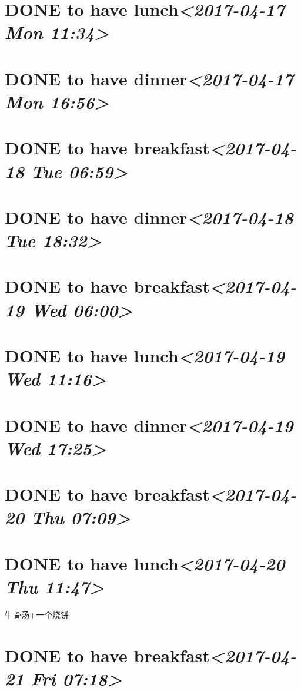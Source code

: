 \documentclass[cyan]{elegantnote}
\begin{document}
\section{{\bfseries\sffamily DONE} to have lunch\textit{<2017-04-17 Mon 11:34>}}
\label{sec:orgaa04249}
\section{{\bfseries\sffamily DONE} to have dinner\textit{<2017-04-17 Mon 16:56>}}
\label{sec:org9fb14c2}
\section{{\bfseries\sffamily DONE} to have breakfast\textit{<2017-04-18 Tue 06:59>}}
\label{sec:orge3dee3d}
\section{{\bfseries\sffamily DONE} to have dinner\textit{<2017-04-18 Tue 18:32>}}
\label{sec:orga96fb44}
\section{{\bfseries\sffamily DONE} to have breakfast\textit{<2017-04-19 Wed 06:00>}}
\label{sec:org2a4e7bb}
\section{{\bfseries\sffamily DONE} to have lunch\textit{<2017-04-19 Wed 11:16>}}
\label{sec:org56d9ffc}
\section{{\bfseries\sffamily DONE} to have dinner\textit{<2017-04-19 Wed 17:25>}}
\label{sec:org1bf4b55}
\section{{\bfseries\sffamily DONE} to have breakfast\textit{<2017-04-20 Thu 07:09>}}
\label{sec:orgf3dd452}
\section{{\bfseries\sffamily DONE} to have lunch\textit{<2017-04-20 Thu 11:47>}}
\label{sec:org33cd449}
牛骨汤+一个烧饼
\section{{\bfseries\sffamily DONE} to have breakfast\textit{<2017-04-21 Fri 07:18>}}
\label{sec:orga3a08cf}
\end{document}
